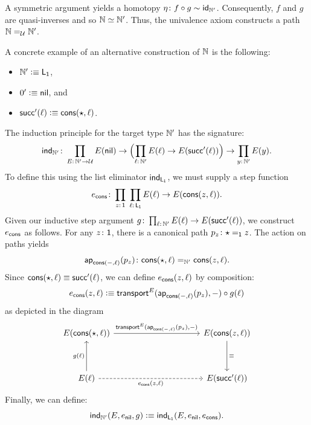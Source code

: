 A symmetric argument yields a homotopy $\eta\colon f\circ g\sim\id_{\N'}$. Consequently, $f$ and $g$ are quasi-inverses and so $\mathbb{N}\simeq\mathbb{N}'$. Thus, the univalence axiom constructs a path $\mathbb{N}\mathrel{=_{\mathcal U}}\mathbb{N}'$.

\begin{xmpl}\label{xmpl:N-from-List(1)}
    A concrete example of an alternative construction of $\mathbb{N}$ is the following:
    \begin{itemize}
        \item $\mathbb{N}'\mathrel{\vcentcolon}\equiv\mathsf{L}_{\mathsf{1}}$,
        \item $0'\mathrel{\vcentcolon}\equiv\mathsf{nil}$, and
        \item $\mathsf{succ}'(\ell)\mathrel{\vcentcolon}\equiv\mathsf{cons}({\mathsf{\star}},\ell)$.
    \end{itemize}
    The induction principle for the target type\/ $\mathbb{N}'$ has the signature:
    \[
        \fun{ind}_{\N'}\colon\prod_{E\colon\N'\to\univ}
            E(\fun{nil})
            \to\Bigl(\prod_{\ell\colon\N'}E(\ell)
                \to E(\fun{succ}'(\ell))\Bigr)
            \to \prod_{y\colon\N'}E(y).
    \]
    To define this using the list eliminator $\mathsf{ind}_{\mathsf{L}_{\mathsf{1}}}$, we must supply a step function
    \[
        e_{\fun{cons}}\colon
            \prod_{z\colon\fun1}\;
            \prod_{\ell\colon\fun L_{\fun1}}
                E(\ell)\to E(\fun{cons}(z,\ell)).
    \]
    Given our inductive step argument $g\colon\prod_{\ell\colon\N'}E(\ell)\to E(\fun{succ}'(\ell))$, we construct $e_{\mathsf{cons}}$ as follows. For any $z\colon\fun1$, there is a canonical path $p_z\colon\fstar\eq{\fun1}z$. The action on paths yields
    \[
        \fun{ap}_{\fun{cons}(\dummy,\ell)}(p_z)\colon
        \fun{cons}(\fstar,\ell)\eq{\N'}\fun{cons}(z,\ell).
    \]
    Since $\mathsf{cons}({\mathsf{\star}},\ell)\equiv\mathsf{succ}'(\ell)$, we can define $e_{\mathsf{cons}}(z,\ell)$ by composition:
    \[
        e_{\mathsf{cons}}(z,\ell)\mathrel{\vcentcolon}\equiv
            \mathsf{transport}^E(\mathsf{ap}_{\mathsf{cons}({\mathord-},\ell)}(p_z),{\mathord-})
                \circ g(\ell)
    \]
    as depicted in the diagram
    \[
        \begin{tikzcd}[row sep=huge,column sep=3.6cm]
            {E(\fun{cons}(\fstar,\ell))}
                    \arrow[r,
                        "{\fun{transport}^E(
                            \fun{ap}_{
                                \fun{cons}
                                    (
                                        \dummy,
                                        \ell
                                    )
                                }(p_z),
                            \dummy)
                        }"]
                &{E(\fun{cons}(z,\ell))}
                        \arrow[d,"\equiv"]\\
            E(\ell)
                    \arrow[u,"g(\ell)"]
                    \arrow[r,
                        dashed,
                        "{e_{\fun{cons}}(z,\ell)}"']
                &E(\fun{succ}'(\ell))
        \end{tikzcd}
    \]
    Finally, we can define:
    \[
        \mathsf{ind}_{\mathbb{N}'}(E,e_{\mathsf{nil}},g)
            \mathrel{\vcentcolon}\equiv\mathsf{ind}_{\mathsf{L}_{\mathsf{1}}}
                (E,e_{\mathsf{nil}},e_{\mathsf{cons}}).
    \]
\end{xmpl}

